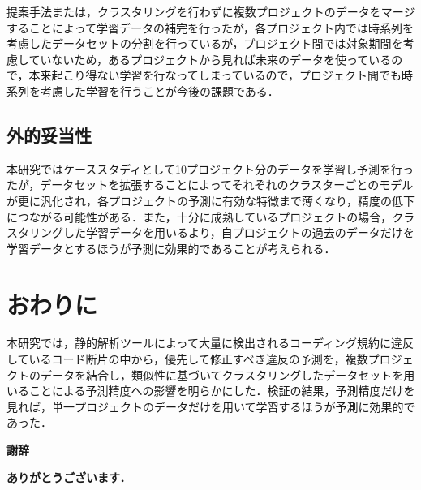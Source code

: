 \documentclass[T,J]{fose} %
\begin{document}
提案手法または，クラスタリングを行わずに複数プロジェクトのデータをマージすることによって学習データの補完を行ったが，各プロジェクト内では時系列を考慮したデータセットの分割を行っているが，プロジェクト間では対象期間を考慮していないため，あるプロジェクトから見れば未来のデータを使っているので，本来起こり得ない学習を行なってしまっているので，プロジェクト間でも時系列を考慮した学習を行うことが今後の課題である．



\subsection{外的妥当性}
本研究ではケーススタディとして10プロジェクト分のデータを学習し予測を行ったが，データセットを拡張することによってそれぞれのクラスターごとのモデルが更に汎化され，各プロジェクトの予測に有効な特徴まで薄くなり，精度の低下につながる可能性がある．また，十分に成熟しているプロジェクトの場合，クラスタリングした学習データを用いるより，自プロジェクトの過去のデータだけを学習データとするほうが予測に効果的であることが考えられる．


\section{おわりに}\label{sec:end}
本研究では，静的解析ツールによって大量に検出されるコーディング規約に違反しているコード断片の中から，優先して修正すべき違反の予測を，複数プロジェクトのデータを結合し，類似性に基づいてクラスタリングしたデータセットを用いることによる予測精度への影響を明らかにした．検証の結果，予測精度だけを見れば，単一プロジェクトのデータだけを用いて学習するほうが予測に効果的であった．

\textbf{謝辞}\

\textbf{ありがとうございます．}




\end{document}
